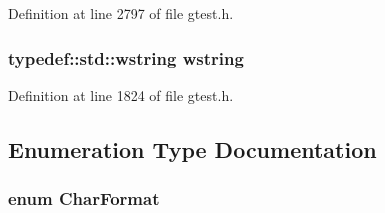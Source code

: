 \-Definition at line 2797 of file gtest.\-h.

\hypertarget{namespacetesting_1_1internal_a393885eea6349a55ca3640cccbe912a6}{
\subsubsection[{wstring}]{\setlength{\rightskip}{0pt plus 5cm}typedef\-::std\-::wstring {\bf wstring}}}\label{d0/da7/namespacetesting_1_1internal_a393885eea6349a55ca3640cccbe912a6}


\-Definition at line 1824 of file gtest.\-h.



\subsection{\-Enumeration \-Type \-Documentation}
\hypertarget{namespacetesting_1_1internal_a86978cfc154f3443116d1405a5777539}{
\subsubsection[{\-Char\-Format}]{\setlength{\rightskip}{0pt plus 5cm}enum {\bf \-Char\-Format}}}\label{d0/da7/namespacetesting_1_1internal_a86978cfc154f3443116d1405a5777539}
